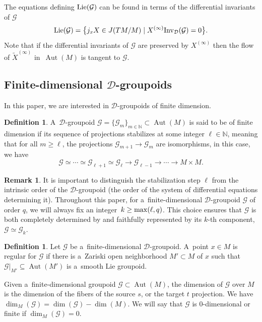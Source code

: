 \documentclass[pdftex]{sigma}
\numberwithin{equation}{section}
\theoremstyle{definition}
\newtheorem{Definition}[Theorem]{Definition}
\newtheorem{Remark}[Theorem]{Remark}
\begin{document}
The equations defining ${\rm Lie}(\mathcal G)$ can be found in terms of the differential invariants of $\mathcal G$
\[{\rm Lie}(\mathcal G) = \big\{j_x X \in J(TM/M) \mid X^{(\infty)}{\rm Inv}_{\mathcal D}(\mathcal G)=0\big\}.
\]
Note that if the differential invariants of $\mathcal G$ are preserved by $X^{(\infty)}$ then the flow of $\widetilde X^{(\infty)}$ in~$\operatorname{Aut}(M)$ is tangent to $\mathcal G$.

\subsection[Finite-dimensional D-groupoids]{Finite-dimensional $\boldsymbol{\mathcal D}$-groupoids}

In this paper, we are interested in $\mathcal D$-groupoids of finite dimension.

\begin{Definition} A~$\mathcal{D}$-groupoid $\mathcal{G} = \{\mathcal{G}_m\}_{m\in \mathbb N}\subset \operatorname{Aut}(M)$ is said to be of finite dimension if its sequence of projections stabilizes at some integer $\ell \in \mathbb N$, meaning that for all $m \geq \ell$, the projections $\mathcal{G}_{m+1}\to \mathcal{G}_m$ are isomorphisms, in this case, we have
 \[\mathcal G \simeq \cdots \simeq \mathcal G_{\ell+1} \simeq \mathcal G_\ell \to \mathcal G_{\ell-1} \to \cdots \to M\times M.\]
\end{Definition}

\begin{Remark}
 It is important to distinguish the stabilization step $\ell$ from the intrinsic order of the $\mathcal{D}$-groupoid (the order of the system of differential equations determining it). Throughout this paper, for a~finite-dimensional $\mathcal{D}$-groupoid $\mathcal{G}$ of order $q$, we will always fix an integer~${k \geq {\rm max}(\ell, q)}$. This choice ensures that $\mathcal{G}$ is both completely determined by and faithfully represented by its $k$-th component, $\mathcal{G} \simeq \mathcal{G}_k$.
\end{Remark}
\begin{Definition}
 Let $\mathcal{G}$ be a~finite-dimensional $\mathcal{D}$-groupoid. A~point $x\in M$ is regular for $\mathcal G$ if there is a~Zariski open neighborhood $M'\subset M$ of $x$ such that $\mathcal G|_{M'}\subseteq \operatorname{Aut}(M')$ is a~smooth Lie groupoid.
\end{Definition}

Given a~finite-dimensional groupoid $\mathcal G\subset \operatorname{Aut}(M)$, the dimension of $\mathcal G$ over $M$ is the dimension of the fibers of the source $s$, or the target $t$ projection. We have $\dim_M(\mathcal G) = \dim(\mathcal G)-\dim(M)$. We will say that $\mathcal G$ is $0$-dimensional or finite if $\dim_M(\mathcal G) = 0$.
\end{document}
